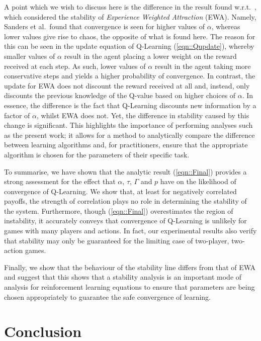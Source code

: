 \documentclass[sigconf]{aamas}
\begin{document}
A point which we wish to discuss here is the difference in the result found w.r.t.~\cite{Sanders2018}, which considered the stability of \textit{Experience Weighted Attraction} (EWA). Namely, Sanders et al.~found that convergence is seen for higher values of $\alpha$, whereas lower values give rise to chaos, the opposite of what is found here. The reason for this can be seen in the update equation of Q-Learning (\ref{eqn::Qupdate}), whereby
smaller values of $\alpha$ result in the agent placing a lower weight on the reward received at each step. As such, lower values of $\alpha$ result in the agent taking more conservative steps and yields a higher probability of convergence. In contrast, the update for EWA does not discount the reward received at all and, instead, only discounts the previous knowledge of the Q-value based on higher choices of $\alpha$. In essence, the difference is the fact that Q-Learning discounts new information by a factor of $\alpha$, whilst EWA does not. Yet, the difference in stability caused by this change is significant. This highlights the importance of performing analyses such as the present work; it allows for a method to analytically compare the difference between learning algorithms and, for practitioners, ensure that the appropriate algorithm is chosen for the parameters of their specific task.

To summarise, we have shown that the analytic result (\ref{eqn::Final}) provides a strong assessment for the effect that $\alpha$, $\tau$, $\Gamma$ and $p$ have on the likelihood of convergence of Q-Learning. We show that, at least for negatively correlated payoffs, the strength of correlation plays no role in determining the stability of the system. Furthermore, though (\ref{eqn::Final}) overestimates the region of instability, it accurately conveys that convergence of Q-Learning is unlikely for games with many players and actions. In fact, our experimental results also verify that stability may only be guaranteed for the limiting case of two-player, two-action games.

Finally, we show that the behaviour of the stability line differs from that of EWA and suggest that this shows that a stability analysis is an important mode of analysis for reinforcement learning equations to ensure that parameters are being chosen appropriately to guarantee the safe convergence of learning. 


\section{Conclusion}
\end{document}
